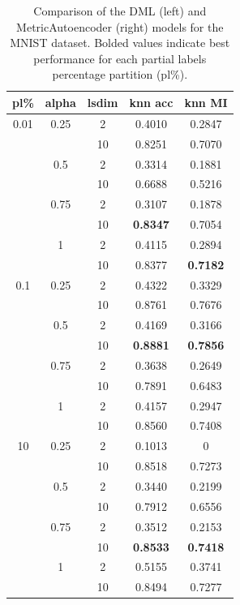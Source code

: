 \documentclass[./dissertation.tex]{subfiles}
\begin{document}
\begin{table}[]
\begin{tabular}{|c|c|c|c|c|}
            \hline
            \textbf{pl\%} & \textbf{alpha} & \textbf{lsdim} & \textbf{knn acc} & \textbf{knn MI}  \\
            \hline
            0.01 & 0.25 & 2 & 0.4010 & 0.2847 \\
             &  & 10 & 0.8251 & 0.7070 \\
             & 0.5 & 2 & 0.3314 & 0.1881 \\
             &  & 10 & 0.6688 & 0.5216 \\
             & 0.75 & 2 & 0.3107 & 0.1878 \\
             &  & 10 & \textbf{0.8347} & 0.7054 \\
             & 1 & 2 & 0.4115 & 0.2894 \\
             &  & 10 & 0.8377 & \textbf{0.7182} \\
            0.1 & 0.25 & 2 & 0.4322 & 0.3329 \\
             &  & 10 & 0.8761 & 0.7676 \\
             & 0.5 & 2 & 0.4169 & 0.3166 \\
             &  & 10 & \textbf{0.8881} & \textbf{0.7856} \\
             & 0.75 & 2 & 0.3638 & 0.2649 \\
             &  & 10 & 0.7891 & 0.6483 \\
             & 1 & 2 & 0.4157 & 0.2947 \\
             &  & 10 & 0.8560 & 0.7408 \\
            10 & 0.25 & 2 & 0.1013 & 0 \\
             &  & 10 & 0.8518 & 0.7273 \\
             & 0.5 & 2 & 0.3440 & 0.2199 \\
             &  & 10 & 0.7912 & 0.6556 \\
             & 0.75 & 2 & 0.3512 & 0.2153 \\
             &  & 10 & \textbf{0.8533} & \textbf{0.7418} \\
             & 1 & 2 & 0.5155 & 0.3741 \\
             &  & 10 & 0.8494 & 0.7277 \\
            \hline
       \end{tabular}
       \caption{Comparison of the DML (left) and MetricAutoencoder (right) models for the MNIST dataset. Bolded values indicate best performance for each partial labels percentage partition (pl\%).\\}
       \label{tab:my_label}
   \end{table}
\end{document}
